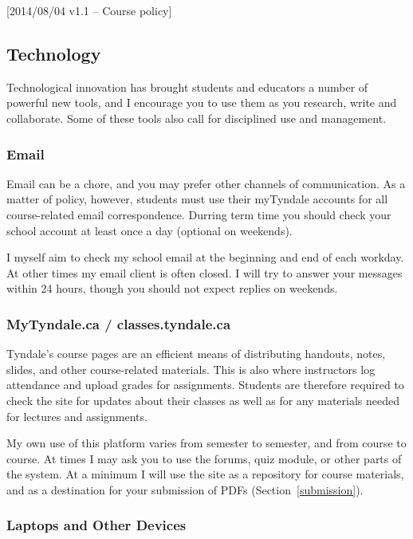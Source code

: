 [2014/08/04 v1.1 -- Course policy]

\subsection{Technology}
\label{technology}

Technological innovation has brought students and educators a number of
powerful new tools, and I encourage you to use them as you research, write and
collaborate. Some of these tools also call for disciplined use and management.

\subsubsection{Email}
\label{email}

Email can be a chore, and you may prefer other channels of communication. As a
matter of policy, however, students must use their myTyndale accounts for all
course-related email correspondence. Durring term time you should check your
school account at least once a day (optional on weekends).

I myself aim to check my school email at the beginning and end of each workday.
At other times my email client is often closed. I will try to answer your
messages within 24 hours, though you should not expect replies on weekends.

\subsubsection{MyTyndale.ca / classes.tyndale.ca}
\label{mytyndale}

Tyndale's course pages are an efficient means of distributing handouts, notes,
slides, and other course-related materials. This is also where instructors log
attendance and upload grades for assignments. Students are therefore required to
check the site for updates about their classes as well as for any materials
needed for lectures and assignments.

My own use of this platform varies from semester to semester, and from
course to course. At times I may ask you to use the forums, quiz module, or
other parts of the system. At a minimum I will use the site as a repository
for course materials, and as a destination for your submission of PDFs
(Section~\ref{submission}).

\subsubsection{Laptops and Other Devices}
\label{laptops}

